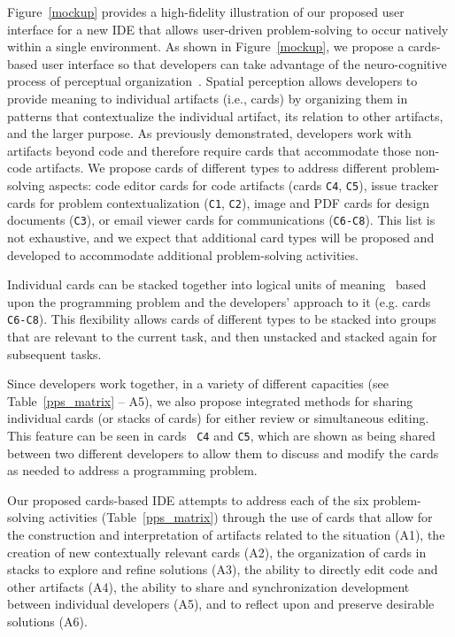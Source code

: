 \documentclass{ppig}
\let\cite\shortcite %
\begin{document}
Figure~\ref{mockup} provides a high-fidelity illustration of our proposed user interface for a new IDE that allows user-driven problem-solving to occur natively within a single environment.
As shown in Figure~\ref{mockup}, we propose a cards-based user interface so that developers can take advantage of the neuro-cognitive process of perceptual organization~\cite{kimchi2003perceptual}.
Spatial perception allows developers to provide meaning to individual artifacts (i.e., cards) by organizing them in patterns that contextualize the individual artifact, its relation to other artifacts, and the larger purpose.
As previously demonstrated, developers work with artifacts beyond code and therefore require cards that accommodate those non-code artifacts.
We propose cards of different types to address different problem-solving aspects: code editor cards for code artifacts (cards \texttt{C4}, \texttt{C5}), issue tracker cards for problem contextualization (\texttt{C1}, \texttt{C2}), image and PDF cards for design documents (\texttt{C3}), or email viewer cards for communications (\texttt{C6-C8}).
This list is not exhaustive, and we expect that additional card types will be proposed and developed to accommodate additional problem-solving activities.

Individual cards can be stacked together into logical units of meaning~\cite{winslow1996programming} based upon the programming problem and the developers' approach to it (e.g. cards \texttt{C6-C8}).
This flexibility allows cards of different types to be stacked into groups that are relevant to the current task, and then unstacked and stacked again for subsequent tasks.

Since developers work together, in a variety of different capacities (see Table~\ref{pps_matrix} -- A5), we also propose integrated methods for sharing individual cards (or stacks of cards) for either review or simultaneous editing.
This feature can be seen in cards ~\texttt{C4} and \texttt{C5}, which are shown as being shared between two different developers to allow them to discuss and modify the cards as needed to address a programming problem.

Our proposed cards-based IDE attempts to address each of the six problem-solving activities (Table~\ref{pps_matrix}) through the use of cards that allow for the construction and interpretation of artifacts related to the situation (A1), the creation of new contextually relevant cards (A2), the organization of cards in stacks to explore and refine solutions (A3), the ability to directly edit code and other artifacts (A4), the ability to share and synchronization development between individual developers (A5), and to reflect upon and preserve desirable solutions (A6).



\end{document}

